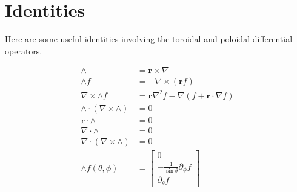\documentclass{article}
\newcommand{\R}{\mathbf{r}}
\begin{document}
\section{Identities}

Here are some useful identities involving the toroidal and poloidal differential operators.

\begin{align}
\wedge &= \R \times \nabla \\
\wedge f &= -\nabla \times \left( \R f \right) \\
\nabla \times \wedge f &= \R \nabla^2 f - \nabla \left( f + \R \cdot \nabla f \right) \\
\wedge \cdot \left( \nabla \times \wedge \right) &= 0 \\
\R \cdot \wedge &= 0 \\
\nabla \cdot \wedge &= 0 \\
\nabla \cdot \left( \nabla \times \wedge \right) &= 0 \\
\wedge f(\theta,\phi) &=
\left[
\begin{array}{c}
0 \\
-\frac{1}{\sin{\theta}} \partial_{\phi} f \\
\partial_{\theta} f
\end{array}
\right]
\end{align}
\end{document}
